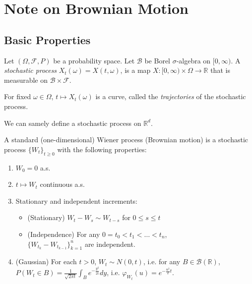 
\section{Note on Brownian Motion}

\subsection{Basic Properties}

\begin{definition}
	Let $(\Omega, \mathcal{F}, P)$ be a probability space. Let $\mathcal{B}$ be Borel $\sigma$-algebra on $[0,\infty )$. A \textit{stochastic process} $X_t (\omega) = X(t, \omega)$, is a map $X: [0,\infty ) \times \Omega \to \mathbb{R}$ that is measurable on $\mathcal{B} \times \mathcal{F}$. 

	For fixed $\omega \in \Omega$, $t \mapsto X_t(\omega)$ is a curve, called the \textit{trajectories} of the stochastic process.

	We can samely define a stochastic process on $\mathbb{R}^d$.
\end{definition}

\begin{definition}
	A standard (one-dimensional) Wiener process (Brownian motion) is a stochastic process $\{W_t\} _{t \ge 0}$ with the following properties:
	\begin{enumerate}
		\item $W_0 = 0$ a.s.
		\item $t \mapsto W_t$ continuous a.s.
		\item Stationary and independent increments:
			\begin{itemize}
				\item (Stationary) $W_t - W_s \sim W_{t - s}$ for $0 \le s \le t$
				\item (Independence) For any $0 = t_0 < t_1 < \ldots < t_n$, \\$\{W_{t_k} - W_{t_{k-1}}\}_{k = 1}^n $ are independent.
			\end{itemize}
		\item (Gaussian) For each $t > 0$, $W_t \sim N(0,t)$, i.e. for any $B \in \mathcal{B}(\mathbb{R})$, $P(W_t \in B) = \frac{1}{\sqrt{2 \pi t} }\int _B e^{- \frac{y^2}{ 2 t}}d y$, i.e. $\varphi_{W_t}(u) = e^{- \frac{u^2}{2}t}$.
	\end{enumerate}
\end{definition}

